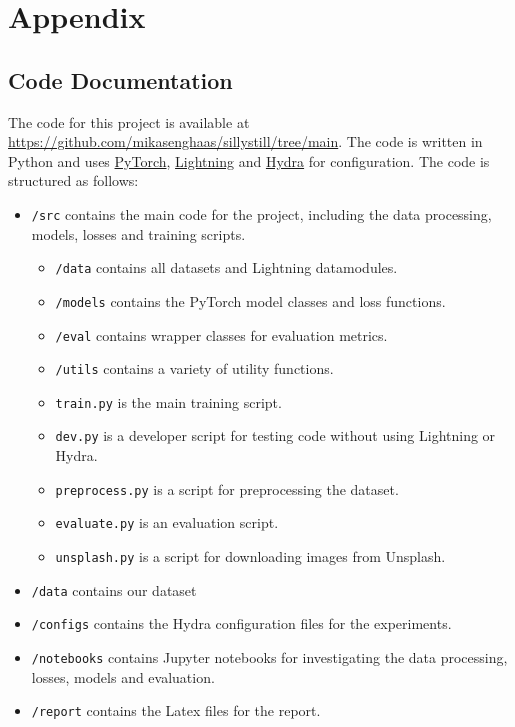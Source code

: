 \newpage
\section{Appendix}
\label{sec:appendix}


\subsection{Code Documentation}
\label{sec:code-documentation}

The code for this project is available at \url{https://github.com/mikasenghaas/sillystill/tree/main}. The code is written in Python and uses \href{https://pytorch.org/}{PyTorch}, \href{https://lightning.ai/docs/pytorch/stable/}{Lightning} and \href{https://hydra.cc/}{Hydra} for configuration. The code is structured as follows:

\begin{itemize}
    \item \texttt{/src} contains the main code for the project, including the data processing, models, losses and training scripts.
        \begin{itemize}
            \item \texttt{/data} contains all datasets and Lightning datamodules. 
            \item \texttt{/models} contains the PyTorch model classes and loss functions.
            \item \texttt{/eval} contains wrapper classes for evaluation metrics.
            \item \texttt{/utils} contains a variety of utility functions.
            \item \texttt{train.py} is the main training script.
            \item \texttt{dev.py} is a developer script for testing code without using Lightning or Hydra.
            \item \texttt{preprocess.py} is a script for preprocessing the dataset.
            \item \texttt{evaluate.py} is an evaluation script.
            \item \texttt{unsplash.py} is a script for downloading images from Unsplash.
        \end{itemize}
    \item \texttt{/data} contains our dataset
    \item \texttt{/configs} contains the Hydra configuration files for the experiments.
    \item \texttt{/notebooks} contains Jupyter notebooks for investigating the data processing, losses, models and evaluation.
    \item \texttt{/report} contains the Latex files for the report.
\end{itemize}

